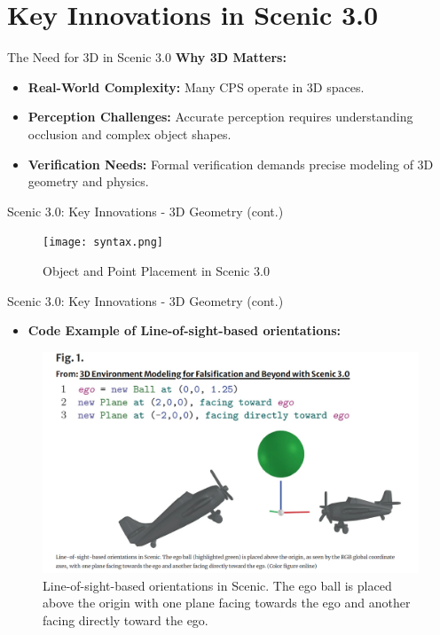 \documentclass[10pt]{beamer}
\begin{document}
\section{Key Innovations in Scenic 3.0}

\begin{frame}{The Need for 3D in Scenic 3.0}
    \textbf{Why 3D Matters:}\\
    \begin{itemize}
        \item \textbf{Real-World Complexity:} Many CPS operate in 3D spaces.
        \item \textbf{Perception Challenges:} Accurate perception requires understanding occlusion and complex object shapes.
        \item \textbf{Verification Needs:} Formal verification demands precise modeling of 3D geometry and physics.
    \end{itemize}
\end{frame}

\begin{frame}{Scenic 3.0: Key Innovations - 3D Geometry (cont.)}
\begin{figure}
\centering
\texttt{[image: syntax.png]}
\caption{Object and Point Placement in Scenic 3.0}
\label{fig:syntax}
\end{figure}
\end{frame}

\begin{frame}{Scenic 3.0: Key Innovations - 3D Geometry (cont.)}
  \begin{itemize}
    \item \textbf{Code Example of Line-of-sight-based orientations:}
  \end{itemize}
\begin{figure}
\centering
\includegraphics[width=0.7\linewidth]{FIG1.png}
\caption{Line-of-sight-based orientations in Scenic. The ego ball is placed above the origin with one plane facing towards the ego and another facing directly toward the ego.}
\label{fig:line-of-sight}
\end{figure}
\end{frame}
\end{document}
